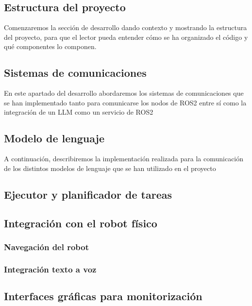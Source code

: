 \documentclass[../main.tex]{subfiles}
\begin{document}
\subsection{Estructura del proyecto}
Comenzaremos la sección de desarrollo dando contexto y mostrando la estructura del proyecto, para que el lector pueda entender cómo se ha organizado el código y qué componentes lo componen. 

\subsection{Sistemas de comunicaciones}
En este apartado del desarrollo abordaremos los sistemas de comunicaciones que se han implementado tanto para comunicarse los nodos de ROS2 entre sí como la integración
de un LLM como un servicio de ROS2

\subsection{Modelo de lenguaje}
A continuación, describiremos la implementación realizada para la comunicación de los distintos modelos de lenguaje que se han utilizado en el proyecto

\subsection{Ejecutor y planificador de tareas}

\subsection{Integración con el robot físico}

\subsubsection{Navegación del robot}

\subsubsection{Integración texto a voz}


\subsection{Interfaces gráficas para monitorización}
\end{document}

